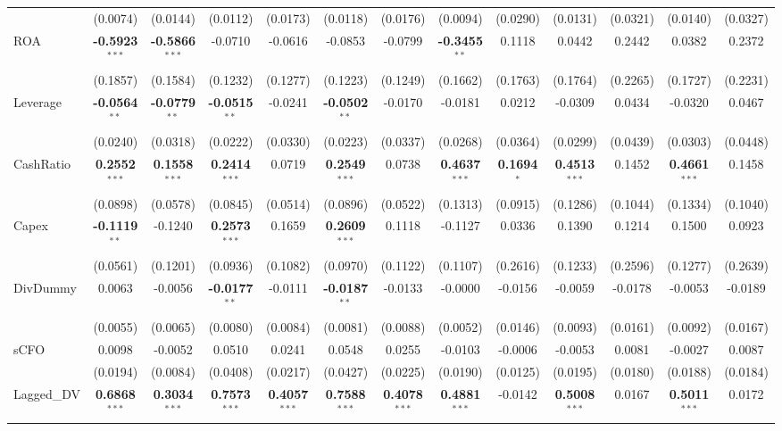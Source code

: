 \documentclass[11pt,a4paper]{article}
\begin{document}
\begin{table}[htbp]
\begin{tabular}{lcccccccccccc}
 & (0.0074) & (0.0144) & (0.0112) & (0.0173) & (0.0118) & (0.0176) & (0.0094) & (0.0290) & (0.0131) & (0.0321) & (0.0140) & (0.0327) \\
ROA & \textbf{-0.5923}$^{***}$ & \textbf{-0.5866}$^{***}$ & -0.0710 & -0.0616 & -0.0853 & -0.0799 & \textbf{-0.3455}$^{**}$ & 0.1118 & 0.0442 & 0.2442 & 0.0382 & 0.2372 \\
 & (0.1857) & (0.1584) & (0.1232) & (0.1277) & (0.1223) & (0.1249) & (0.1662) & (0.1763) & (0.1764) & (0.2265) & (0.1727) & (0.2231) \\
Leverage & \textbf{-0.0564}$^{**}$ & \textbf{-0.0779}$^{**}$ & \textbf{-0.0515}$^{**}$ & -0.0241 & \textbf{-0.0502}$^{**}$ & -0.0170 & -0.0181 & 0.0212 & -0.0309 & 0.0434 & -0.0320 & 0.0467 \\
 & (0.0240) & (0.0318) & (0.0222) & (0.0330) & (0.0223) & (0.0337) & (0.0268) & (0.0364) & (0.0299) & (0.0439) & (0.0303) & (0.0448) \\
CashRatio & \textbf{0.2552}$^{***}$ & \textbf{0.1558}$^{***}$ & \textbf{0.2414}$^{***}$ & 0.0719 & \textbf{0.2549}$^{***}$ & 0.0738 & \textbf{0.4637}$^{***}$ & \textbf{0.1694}$^{*}$ & \textbf{0.4513}$^{***}$ & 0.1452 & \textbf{0.4661}$^{***}$ & 0.1458 \\
 & (0.0898) & (0.0578) & (0.0845) & (0.0514) & (0.0896) & (0.0522) & (0.1313) & (0.0915) & (0.1286) & (0.1044) & (0.1334) & (0.1040) \\
Capex & \textbf{-0.1119}$^{**}$ & -0.1240 & \textbf{0.2573}$^{***}$ & 0.1659 & \textbf{0.2609}$^{***}$ & 0.1118 & -0.1127 & 0.0336 & 0.1390 & 0.1214 & 0.1500 & 0.0923 \\
 & (0.0561) & (0.1201) & (0.0936) & (0.1082) & (0.0970) & (0.1122) & (0.1107) & (0.2616) & (0.1233) & (0.2596) & (0.1277) & (0.2639) \\
DivDummy & 0.0063 & -0.0056 & \textbf{-0.0177}$^{**}$ & -0.0111 & \textbf{-0.0187}$^{**}$ & -0.0133 & -0.0000 & -0.0156 & -0.0059 & -0.0178 & -0.0053 & -0.0189 \\
 & (0.0055) & (0.0065) & (0.0080) & (0.0084) & (0.0081) & (0.0088) & (0.0052) & (0.0146) & (0.0093) & (0.0161) & (0.0092) & (0.0167) \\
sCFO & 0.0098 & -0.0052 & 0.0510 & 0.0241 & 0.0548 & 0.0255 & -0.0103 & -0.0006 & -0.0053 & 0.0081 & -0.0027 & 0.0087 \\
 & (0.0194) & (0.0084) & (0.0408) & (0.0217) & (0.0427) & (0.0225) & (0.0190) & (0.0125) & (0.0195) & (0.0180) & (0.0188) & (0.0184) \\
Lagged\_DV & \textbf{0.6868}$^{***}$ & \textbf{0.3034}$^{***}$ & \textbf{0.7573}$^{***}$ & \textbf{0.4057}$^{***}$ & \textbf{0.7588}$^{***}$ & \textbf{0.4078}$^{***}$ & \textbf{0.4881}$^{***}$ & -0.0142 & \textbf{0.5008}$^{***}$ & 0.0167 & \textbf{0.5011}$^{***}$ & 0.0172 \\

\end{tabular}
\end{table}
\end{document}
